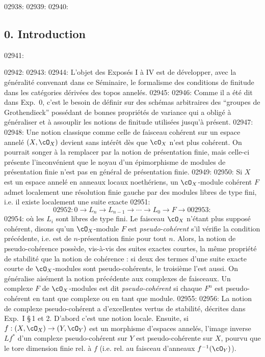 02938: 
02939: %
02940: \subsection*{0. Introduction}
02941: 
02942: %
02943: 
02944: L'objet des Expos\'es I \`a IV est de d\'evelopper, avec la g\'en\'eralit\'e convenant dans ce S\'eminaire, le formalisme des conditions de finitude dans les cat\'egories d\'eriv\'ees des topos annel\'es.
02945: 
02946: Comme il a \'et\'e dit dans Exp.~0, c'est le besoin de d\'efinir sur des sch\'emas arbitraires des ``groupes de Grothendieck'' poss\'edant de bonnes propri\'et\'es de variance qui a oblig\'e \`a g\'en\'eraliser et \`a assouplir les notions de finitude utilis\'ees jusqu'\`a pr\'esent.
02947: 
02948: Une notion classique comme celle de faisceau coh\'erent sur un espace annel\'e $(X, \cO_X)$ devient sans int\'er\^et d\`es que $\cO_X$ n'est plus coh\'erent. On pourrait songer \`a la remplacer par la notion de pr\'esentation finie, mais celle-ci pr\'esente l'inconv\'enient que le noyau d'un \'epimorphisme de modules de pr\'esentation finie n'est pas en g\'en\'eral de pr\'esentation finie.
02949: 
02950: Si $X$ est un espace annel\'e en anneaux locaux noeth\'eriens, un $\cO_X$-module coh\'erent $F$ admet localement une r\'esolution finie gauche par des modules libres de type fini, i.e. il existe localement une suite exacte
02951: \[
02952: 0 \longrightarrow L_n \longrightarrow L_{n-1} \longrightarrow \cdots \longrightarrow L_0 \longrightarrow F \longrightarrow 0
02953: \]
02954: o\`u les $L_i$ sont libres de type fini. Le faisceau $\cO_X$ n'\'etant plus suppos\'e coh\'erent, disons qu'un $\cO_X$-module $F$ est \emph{pseudo-coh\'erent} s'il v\'erifie la condition pr\'ec\'edente, i.e. est de $n$-pr\'esentation finie pour tout $n$. Alors, la notion de pseudo-coh\'erence poss\`ede, vis-\`a-vis des suites exactes courtes, la m\^eme propri\'et\'e de stabilit\'e que la notion de coh\'erence : si deux des termes d'une suite exacte courte de $\cO_X$-modules sont pseudo-coh\'erents, le troisi\`eme l'est aussi. On g\'en\'eralise ais\'ement la notion pr\'ec\'edente aux complexes de faisceaux. Un complexe $F$ de $\cO_X$-modules est dit \emph{pseudo-coh\'erent} si chaque $F^n$ est pseudo-coh\'erent en tant que complexe ou en tant que module.
02955: 
02956: La notion de complexe pseudo-coh\'erent a d'excellentes vertus de stabilit\'e, d\'ecrites dans Exp.~I \S\,1 et 2. D'abord c'est une notion locale. Ensuite, si $f : (X, \cO_X) \to (Y, \cO_Y)$ est un morphisme d'espaces annel\'es, l'image inverse $Lf^*$ d'un complexe pseudo-coh\'erent sur $Y$ est pseudo-coh\'erente sur $X$, pourvu que le tore dimension finie rel. \`a $f$ (i.e. rel. au faisceau d'anneaux $f^{-1}(\cO_Y)$).
